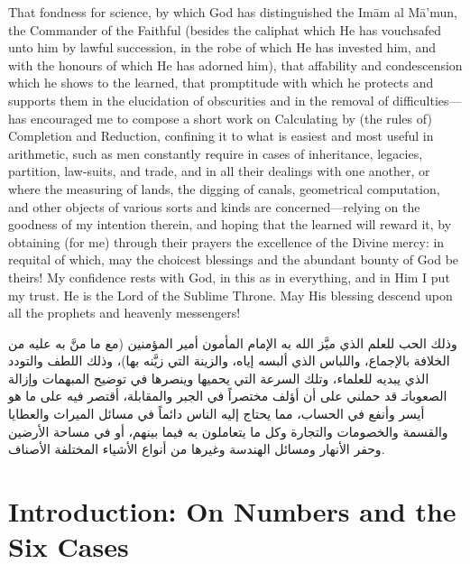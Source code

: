 \documentclass[11pt,a4paper,openany,oneside]{book}
\begin{document}
That fondness for science, by which God has distinguished the Im\=am al
M\=a'mun, the Commander of the Faithful (besides the caliphat which He has
vouchsafed unto him by lawful succession, in the robe of which He has invested
him, and with the honours of which He has adorned him), that affability and
condescension which he shows to the learned, that promptitude with which he
protects and supports them in the elucidation of obscurities and in the
removal of difficulties---has encouraged me to compose a short work on
Calculating by (the rules of) Completion and Reduction, confining it to what
is easiest and most useful in arithmetic, such as men constantly require in
cases of inheritance, legacies, partition, law-suits, and trade, and in all
their dealings with one another, or where the measuring of lands, the digging
of canals, geometrical computation, and other objects of various sorts and
kinds are concerned---relying on the goodness of my intention therein, and
hoping that the learned will reward it, by obtaining (for me) through their
prayers the excellence of the Divine mercy: in requital of which, may the
choicest blessings and the abundant bounty of God be theirs! My confidence
rests with God, in this as in everything, and in Him I put my trust. He is
the Lord of the Sublime Throne. May His blessing descend upon all the
prophets and heavenly messengers!

\begin{arabicbox}
\begin{Arabic}
وذلك الحب للعلم الذي ميَّز الله به الإمام المأمون أمير المؤمنين
(مع ما منَّ به عليه من الخلافة بالإجماع، واللباس الذي ألبسه
إياه، والزينة التي زيَّنه بها)، وذلك اللطف والتودد الذي يبديه
للعلماء، وتلك السرعة التي يحميها وينصرها في توضيح المبهمات
وإزالة الصعوباتـ قد حملني على أن أؤلف مختصراً في الجبر
والمقابلة، أقتصر فيه على ما هو أيسر وأنفع في الحساب، مما
يحتاج إليه الناس دائماً في مسائل الميراث والعطايا والقسمة
والخصومات والتجارة وكل ما يتعاملون به فيما بينهم، أو في
مساحة الأرضين وحفر الأنهار ومسائل الهندسة وغيرها من
أنواع الأشياء المختلفة الأصناف.
\end{Arabic}
\end{arabicbox}

\newpage


\chapter{Introduction: On Numbers and the Six Cases}
\label{ch:intro}
\end{document}
